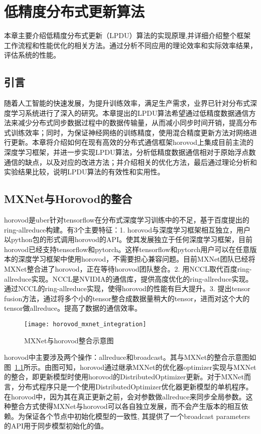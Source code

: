 \chapter{低精度分布式更新算法}
本章主要介绍低精度分布式更新（LPDU）算法的实现原理,并详细介绍整个框架工作流程和性能优化的相关方法。通过分析不同应用的理论效率和实际效率结果，评估系统的性能。
\section{引言}
随着人工智能的快速发展，为提升训练效率，满足生产需求，业界已针对分布式深度学习系统进行了深入的研究。本章提出的LPDU算法希望通过低精度数据通信方法来减少分布式同步数据过程中的数据传输量，从而减小同步时间开销，提高分布式训练效率；同时，为保证神经网络的训练精度，使用混合精度更新方法对网络进行更新。本章将介绍如何在现有高效的分布式通信框架horovod上集成目前主流的深度学习框架，并进一步实现LPDU算法，分析低精度数据通信相对于原始浮点数通信的缺点，以及对应的改进方法；并介绍相关的优化方法，最后通过理论分析和实验结果比较，说明LPDU算法的有效性和实用性。
\section{MXNet与Horovod的整合}
horovod是uber针对tensorflow在分布式深度学习训练中的不足，基于百度提出的ring-allreduce构建。有3个主要特征：1. horovod与深度学习框架相互独立，用户以python包的形式调用horovod的API。使其发展独立于任何深度学习框架，目前horovod已经支持tensorflow和pytorch。这样tensorflow和pytorch用户可以在任意版本的深度学习框架中使用horovod，不需要担心兼容问题。目前MXNet团队已经将MXNet整合进了horovod，正在等待horovod团队整合。2. 用NCCL取代百度ring-allreduce实现。NCCL是NVIDIA的通信库，提供高度优化的ring-allreduce实现。通过NCCL的ring-allreduce实现，使得horovod的性能有巨大提升。3. 提出tensor fusion方法，通过将多个小的tensor整合成数据量稍大的tensor，进而对这个大的tensor做allreduce。提高了数据的通信效率。

\begin{figure}[htp]
\centering
\texttt{[image: horovod\_mxnet\_integration]}
\caption{MXNet与horovod整合示意图}
\label{fig:horovod_mxnet_integration}
\end{figure}
horovod中主要涉及两个操作：allreduce和broadcast。其与MXNet的整合示意图如图~\ref{fig:horovod_mxnet_integration}所示。由图可知，horovod通过继承MXNet的优化器optimizer实现与MXNet的整合，即更新模型时使用horovod的DistributedOptimizer更新。对于MXNet而言，分布式程序只是一个使用DistributedOptimizer优化器更新模型的单机程序。在horovod中，因为其在真正更新之前，会对参数做allreduce来同步全局参数。这种整合方式使得MXNet与horovod可以各自独立发展，而不会产生版本的相互依赖。为保证各个节点中初始化模型的一致性, 其提供了一个broadcast parameters的API用于同步模型初始化的值。

